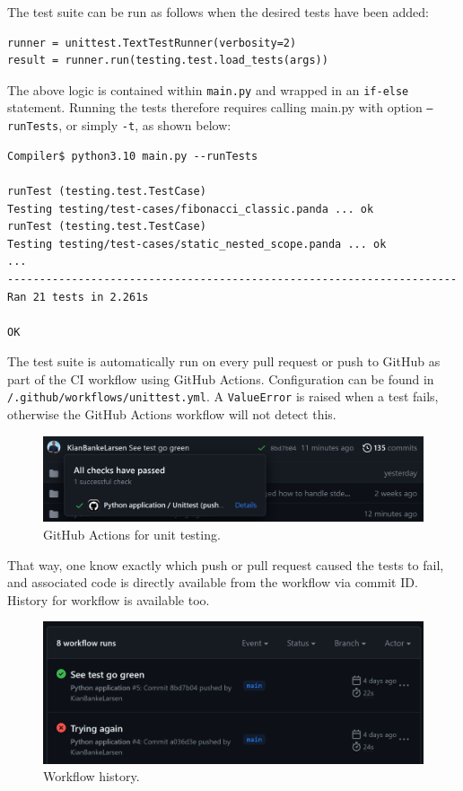 The test suite can be run as follows when the desired tests have been added:

\begin{verbatim}
runner = unittest.TextTestRunner(verbosity=2)
result = runner.run(testing.test.load_tests(args))
\end{verbatim}

The above logic is contained within \texttt{main.py} and wrapped in an \texttt{if-else} statement. Running the tests therefore requires calling main.py with option \texttt{--runTests}, or simply \texttt{-t}, as shown below:

\begin{verbatim}
Compiler$ python3.10 main.py --runTests

runTest (testing.test.TestCase)
Testing testing/test-cases/fibonacci_classic.panda ... ok
runTest (testing.test.TestCase)
Testing testing/test-cases/static_nested_scope.panda ... ok
...
----------------------------------------------------------------------
Ran 21 tests in 2.261s

OK 
\end{verbatim}

The test suite is automatically run on every pull request or push to GitHub as part of the CI workflow using GitHub Actions. Configuration can be found in \texttt{/.github/workflows/unittest.yml}. A \texttt{ValueError} is raised when a test fails, otherwise the GitHub Actions workflow will not detect this.

\begin{figure}[H]
    \centering
    \includegraphics[width=1\textwidth]{misc/images/GitHub_Actions.png}
    \caption{GitHub Actions for unit testing.}
\end{figure}

That way, one know exactly which push or pull request caused the tests to fail, and associated code is directly available from the workflow via commit ID. History for workflow is available too.

\begin{figure}[H]
    \centering
    \includegraphics[width=1\textwidth]{misc/images/Workflow.png}
    \caption{Workflow history.}
\end{figure}


